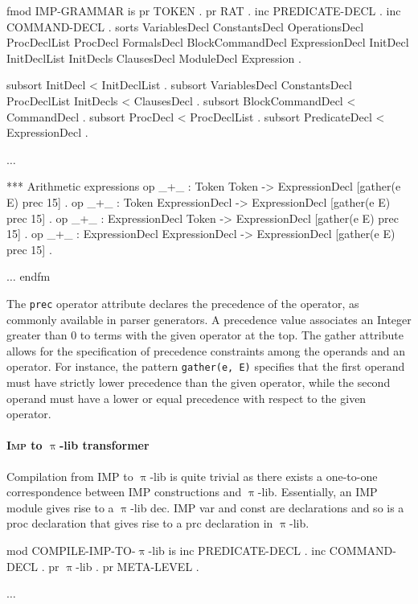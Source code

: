 \documentclass{llncs}%
\begin{document}
\begin{maude}[caption=\textsc{Imp} grammar as a Maude functional module, label=lst:imp-grammar]
fmod IMP-GRAMMAR is
 pr TOKEN . pr RAT .
 inc PREDICATE-DECL . inc COMMAND-DECL .
 sorts VariablesDecl ConstantsDecl OperationsDecl ProcDeclList
       ProcDecl FormalsDecl BlockCommandDecl ExpressionDecl
       InitDecl InitDeclList InitDecls ClausesDecl
       ModuleDecl Expression .

 subsort InitDecl < InitDeclList .
 subsort VariablesDecl ConstantsDecl ProcDeclList InitDecls < ClausesDecl .
 subsort BlockCommandDecl < CommandDecl .
 subsort ProcDecl < ProcDeclList .
 subsort PredicateDecl < ExpressionDecl .

$\ldots$

 *** Arithmetic expressions
 op _+_ : Token Token -> ExpressionDecl [gather(e E) prec 15] .
 op _+_ : Token ExpressionDecl -> ExpressionDecl [gather(e E) prec 15] .
 op _+_ : ExpressionDecl Token -> ExpressionDecl [gather(e E) prec 15] .
 op _+_ : ExpressionDecl ExpressionDecl -> ExpressionDecl [gather(e E) prec 15] .

$\ldots$
endfm
\end{maude}
 
The \texttt{prec} operator attribute declares the precedence of the operator, as commonly available in parser generators. A precedence value associates an Integer greater than $0$ to terms with the given operator at the top. The gather attribute allows for the specification of precedence constraints among the operands and an operator. For instance, the pattern \texttt{gather(e, E)} specifies that the first operand must have strictly lower precedence than the given operator, while the second operand must have a lower or equal precedence with respect to the given operator. 

\paragraph{\textsc{Imp} to $\uppi$-lib transformer}

Compilation from IMP to $\uppi$-lib is quite trivial as there exists a one-to-one correspondence between IMP constructions and $\uppi$-lib. Essentially, an IMP {\Tt{}module\nwendquote} gives rise to a $\uppi$-lib {\Tt{}dec\nwendquote}. IMP {\Tt{}var\nwendquote} and {\Tt{}const\nwendquote} are declarations and so is a {\Tt{}proc\nwendquote} declaration that gives rise to a {\Tt{}prc\nwendquote} declaration in $\uppi$-lib. 
\begin{maude}
mod COMPILE-IMP-TO-$\uppi$-lib is
 inc PREDICATE-DECL .
 inc COMMAND-DECL .
 pr $\uppi$-lib .
 pr META-LEVEL .

$\ldots$
\end{maude}
\end{document}
